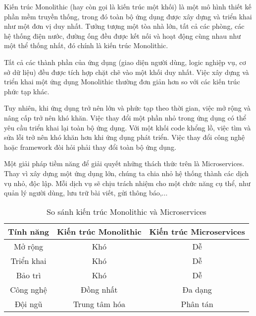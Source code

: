\documentclass[../index.tex]{subfiles}
\begin{document}
    Kiến trúc Monolithic (hay còn gọi là kiến trúc một khối) là một mô hình thiết
    kế phần mềm truyền thống, trong đó toàn bộ ứng dụng được xây dựng và triển
    khai như một đơn vị duy nhất. Tưởng tượng một tòa nhà lớn, tất cả các phòng,
    các hệ thống điện nước, đường ống đều được kết nối và hoạt động cùng nhau
    như một thể thống nhất, đó chính là kiến trúc Monolithic.

    Tất cả các thành phần của ứng dụng (giao diện người dùng, logic nghiệp vụ,
    cơ sở dữ liệu) đều được tích hợp chặt chẽ vào một khối duy nhất. Việc xây
    dựng và triển khai một ứng dụng Monolithic thường đơn giản hơn so với các
    kiến trúc phức tạp khác.

    Tuy nhiên, khi ứng dụng trở nên lớn và phức tạp theo thời gian, việc mở rộng
    và nâng cấp trở nên khó khăn. Việc thay đổi một phần nhỏ trong ứng dụng có thể
    yêu cầu triển khai lại toàn bộ ứng dụng. Với một khối code khổng lồ, việc tìm
    và sửa lỗi trở nên khó khăn hơn khi ứng dụng phát triển. Việc thay đổi công
    nghệ hoặc framework đòi hỏi phải thay đổi toàn bộ ứng dụng.

    Một giải pháp tiềm năng để giải quyết những thách thức trên là Microservices.
    Thay vì xây dựng một ứng dụng lớn, chúng ta chia nhỏ hệ thống thành các dịch
    vụ nhỏ, độc lập. Mỗi dịch vụ sẽ chịu trách nhiệm cho một chức năng cụ thể, như
    quản lý người dùng, lưu trữ bài viết, gửi thông báo,...

    \begin{table}[H]
        \centering
        {}
        \begin{tabular}{ |c|c|c| }
            \hline
            Tính năng  & Kiến trúc Monolithic & Kiến trúc Microservices \\
            \hline
            Mở rộng    & Khó                  & Dễ                      \\
            \hline
            Triển khai & Khó                  & Dễ                      \\
            \hline
            Bảo trì    & Khó                  & Dễ                      \\
            \hline
            Công nghệ  & Đồng nhất            & Đa dạng                 \\
            \hline
            Đội ngũ    & Trung tâm hóa        & Phân tán                \\
            \hline
        \end{tabular}
        \caption{So sánh kiến trúc Monolithic và Microservices}
    \end{table}
\end{document}

